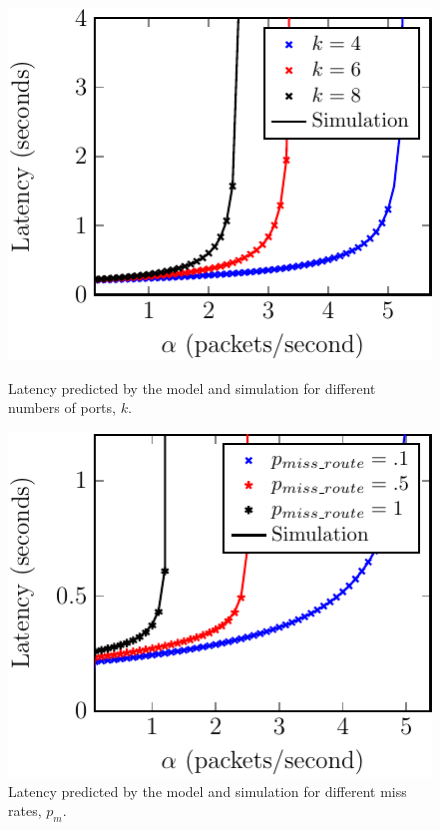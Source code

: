 \begin{figure}
	\vspace{2mm}

	\centering
	\begin{minipage}[b]{.49\textwidth}
		\includegraphics[width=\linewidth]{graphs/num_ports-crop}
		\caption{Latency predicted by the model and simulation for different numbers
			of ports, $k$.}
		\label{fig:num_ports}
	\end{minipage}
	\hfill
	\begin{minipage}[b]{.49\textwidth}
		\includegraphics[width=\linewidth]{graphs/diff_sdn-crop}
		\caption{Latency predicted by the model and simulation for different miss rates, $p_{m}$.}
		\label{fig:sdn_perc}
	\end{minipage}

\end{figure}

